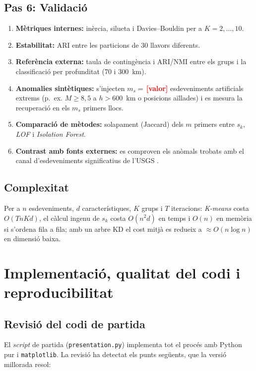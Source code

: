 \documentclass[11pt,a4paper]{article}
\newcommand{\pend}[1]{\textcolor{red}{\textbf{[#1]}}}
\begin{document}
\subsection{Pas 6: Validació}\label{sec:metodo-validacio}
\begin{enumerate}[nosep]
  \item \textbf{Mètriques internes:} inèrcia, silueta i Davies--Bouldin per a
        $K=2,\dots,10$.
  \item \textbf{Estabilitat:} ARI entre les particions de 30 llavors diferents.
  \item \textbf{Referència externa:} taula de contingència i ARI/NMI entre els
        grups i la classificació per profunditat (70 i 300~km).
  \item \textbf{Anomalies sintètiques:} s'injecten $m_s=\,$\pend{valor} esdeveniments
        artificials extrems (p.~ex. $M\ge 8{,}5$ a $h>600$~km o
        posicions aïllades) i es mesura la recuperació en els $m_s$ primers
        llocs.
  \item \textbf{Comparació de mètodes:} solapament (Jaccard) dels $m$ primers
        entre $s_k$, \textit{LOF} i \textit{Isolation Forest}.
  \item \textbf{Contrast amb fonts externes:} es comproven els anòmals
        trobats amb el canal d'esdeveniments significatius de l'USGS
        \cite{usgs}.
\end{enumerate}

\subsection{Complexitat}
Per a $n$ esdeveniments, $d$ característiques, $K$ grups i $T$ iteracions:
\textit{K-means} costa $O(TnKd)$, el càlcul ingenu de $s_k$ costa
$O(n^2d)$ en temps i $O(n)$ en memòria si s'ordena fila a fila; amb un arbre
KD el cost mitjà es redueix a $\approx O(n\log n)$ en dimensió baixa.

\section{Implementació, qualitat del codi i reproducibilitat}\label{sec:implementacio}

\subsection{Revisió del codi de partida}
El \textit{script} de partida (\texttt{presentation.py}) implementa tot el
procés amb Python pur i \texttt{matplotlib}. La revisió ha detectat els
punts següents, que la versió millorada resol:
\end{document}
